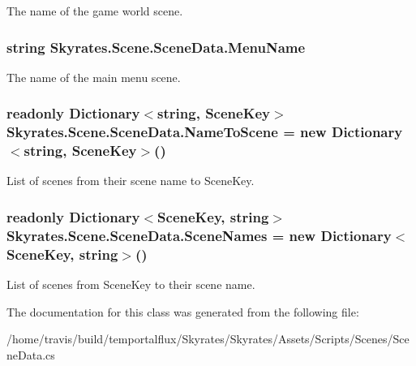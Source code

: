 The name of the game world scene. 

\hypertarget{class_skyrates_1_1_scene_1_1_scene_data_ac0464dba79d7d798be14890ee3cb7d61}{
\subsubsection[{Menu\-Name}]{\setlength{\rightskip}{0pt plus 5cm}string Skyrates.\-Scene.\-Scene\-Data.\-Menu\-Name}}\label{class_skyrates_1_1_scene_1_1_scene_data_ac0464dba79d7d798be14890ee3cb7d61}


The name of the main menu scene. 

\hypertarget{class_skyrates_1_1_scene_1_1_scene_data_a86621efde09f0912b1341bde02da2b99}{
\subsubsection[{Name\-To\-Scene}]{\setlength{\rightskip}{0pt plus 5cm}readonly Dictionary$<$string, {\bf Scene\-Key}$>$ Skyrates.\-Scene.\-Scene\-Data.\-Name\-To\-Scene = new Dictionary$<$string, {\bf Scene\-Key}$>$()}}\label{class_skyrates_1_1_scene_1_1_scene_data_a86621efde09f0912b1341bde02da2b99}


List of scenes from their scene name to Scene\-Key. 

\hypertarget{class_skyrates_1_1_scene_1_1_scene_data_a35a18084f2186d9e25993bdc1f3c774a}{
\subsubsection[{Scene\-Names}]{\setlength{\rightskip}{0pt plus 5cm}readonly Dictionary$<${\bf Scene\-Key}, string$>$ Skyrates.\-Scene.\-Scene\-Data.\-Scene\-Names = new Dictionary$<${\bf Scene\-Key}, string$>$()}}\label{class_skyrates_1_1_scene_1_1_scene_data_a35a18084f2186d9e25993bdc1f3c774a}


List of scenes from Scene\-Key to their scene name. 



The documentation for this class was generated from the following file\-:\begin{DoxyCompactItemize}
\item 
/home/travis/build/temportalflux/\-Skyrates/\-Skyrates/\-Assets/\-Scripts/\-Scenes/Scene\-Data.\-cs\end{DoxyCompactItemize}
